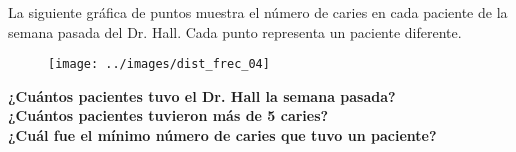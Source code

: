 La siguiente gráfica de puntos muestra el número de caries en cada paciente de la semana pasada del Dr. Hall. Cada punto representa un paciente diferente.
\begin{figure}[H]
    \begin{center}
        \texttt{[image: ../images/dist\_frec\_04]}
    \end{center}
    \caption{}
    \label{fig:dist_frec_04}
\end{figure}
\textbf{¿Cuántos pacientes tuvo el Dr. Hall la semana pasada?}\\
\textbf{¿Cuántos pacientes tuvieron más de 5 caries?}\\
\textbf{¿Cuál fue el mínimo número de caries que tuvo un paciente?}